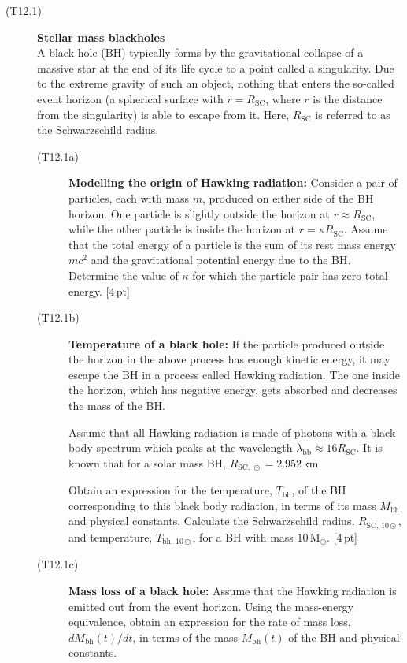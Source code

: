 \begin{description}
\item[(T12.1)] \textbf{Stellar mass blackholes}\\
  A black hole (BH) typically forms by the gravitational collapse of a massive
  star at the end of its life cycle to a point called a singularity. Due to
  the extreme gravity of such an object, nothing that enters the so-called
  event horizon (a spherical surface with $r = R_{\mathrm{SC}}$, where $r$ is
  the distance from the singularity) is able to escape from it. Here,
  $R_{\mathrm{SC}}$ is referred to as the Schwarzschild radius.
  \begin{description}
  \item[(T12.1a)] \textbf{Modelling the origin of Hawking radiation:}
    Consider a pair of particles, each with mass $m$, produced on either side
    of the BH horizon. One particle is slightly outside the horizon at
    $r \approx R_{\mathrm{SC}}$, while the other particle is inside the
    horizon at $r = \kappa R_{\mathrm{SC}}$. Assume that the total energy of a
    particle is the sum of its rest mass energy $mc^2$ and the gravitational
    potential energy due to the BH. Determine the value of $\kappa$ for which
    the particle pair has zero total energy. \hfill[4\,pt]
  \item[(T12.1b)] \textbf{Temperature of a black hole:} If the particle
    produced outside the horizon in the above process has enough kinetic
    energy, it may escape the BH in a process called Hawking radiation. The
    one inside the horizon, which has negative energy, gets absorbed and
    decreases the mass of the BH.

    Assume that all Hawking radiation is made of photons with a black body
    spectrum which peaks at the wavelength
    $\lambda_{\mathrm{bb}} \approx 16R_{\mathrm{SC}}$. It is known that for a
    solar mass BH, $R_{\mathrm{SC},\,\odot} = 2.952$\,km.

    Obtain an expression for the temperature, $T_{\mathrm{bh}}$, of the BH
    corresponding to this black body radiation, in terms of its mass
    $M_{\mathrm{bh}}$ and physical constants. Calculate the Schwarzschild
    radius, $R_{\mathrm{SC},\,10\odot}$, and temperature,
    $T_{\mathrm{bh},\,10\odot}$, for a BH with mass $10\,\mathrm{M}_\odot$.
    \hfill[4\,pt]
  \item[(T12.1c)] \textbf{Mass loss of a black hole:} Assume that the Hawking
    radiation is emitted out from the event horizon. Using the mass-energy
    equivalence, obtain an expression for the rate of mass loss,
    $dM_{\mathrm{bh}}(t)/dt$, in terms of the mass $M_{\mathrm{bh}}(t)$ of the
    BH and physical constants.


\end{description}
\end{description}
